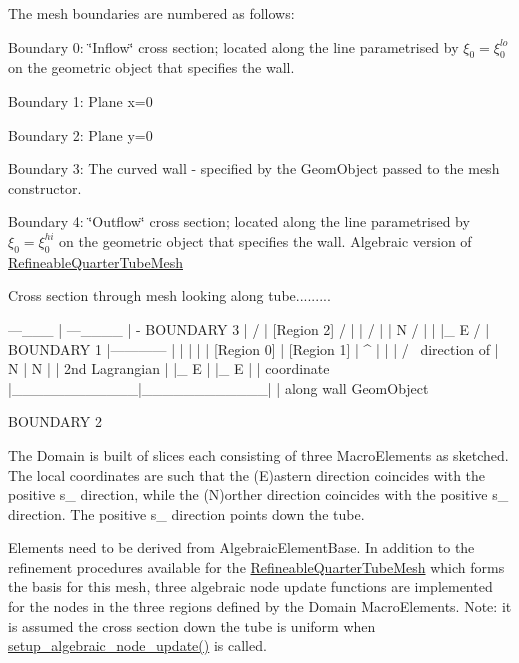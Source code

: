 The mesh boundaries are numbered as follows\+:
\begin{DoxyItemize}
\item Boundary 0\+: \char`\"{}\+Inflow\char`\"{} cross section; located along the line parametrised by $ \xi_0 = \xi_0^{lo} $ on the geometric object that specifies the wall.
\item Boundary 1\+: Plane x=0
\item Boundary 2\+: Plane y=0
\item Boundary 3\+: The curved wall -\/ specified by the Geom\+Object passed to the mesh constructor.
\item Boundary 4\+: \char`\"{}\+Outflow\char`\"{} cross section; located along the line parametrised by $ \xi_0 = \xi_0^{hi} $ on the geometric object that specifies the wall. Algebraic version of \hyperlink{classoomph_1_1RefineableQuarterTubeMesh}{Refineable\+Quarter\+Tube\+Mesh}
\end{DoxyItemize}

Cross section through mesh looking along tube......... \begin{DoxyVerb}                 ---___
                |      ---____
                |              -   BOUNDARY 3
                |                /
                |  [Region 2]   /  |
                |              /     |
                | N           /        |
                | |_ E       /          |
  BOUNDARY 1    |------------            |
                |            |            |
                | [Region 0] | [Region 1] |  ^
                |            |            | / \  direction of
                | N          |    N       |  |   2nd Lagrangian
                | |_ E       |    |_ E    |  |   coordinate
                |____________|____________|  |   along wall GeomObject

                      BOUNDARY 2
\end{DoxyVerb}


The Domain is built of slices each consisting of three Macro\+Elements as sketched. The local coordinates are such that the (E)astern direction coincides with the positive s\+\_ direction, while the (N)orther direction coincides with the positive s\+\_ direction. The positive s\+\_ direction points down the tube.

Elements need to be derived from Algebraic\+Element\+Base. In addition to the refinement procedures available for the \hyperlink{classoomph_1_1RefineableQuarterTubeMesh}{Refineable\+Quarter\+Tube\+Mesh} which forms the basis for this mesh, three algebraic node update functions are implemented for the nodes in the three regions defined by the Domain Macro\+Elements. Note\+: it is assumed the cross section down the tube is uniform when \hyperlink{classoomph_1_1AlgebraicRefineableQuarterTubeMesh_a2d0312615834a2aec8d0d6d4e2c846ef}{setup\+\_\+algebraic\+\_\+node\+\_\+update()} is called. 

